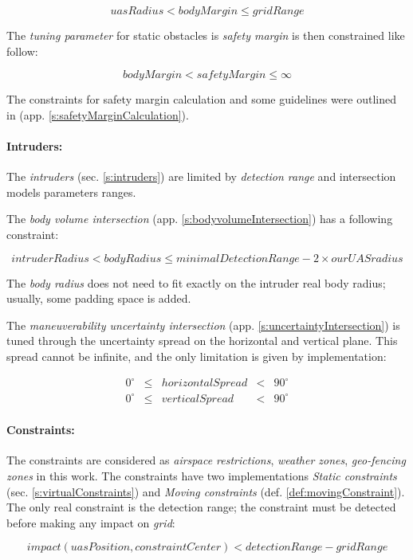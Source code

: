 \begin{equation*}
    uas Radius < body Margin \le grid Range
\end{equation*}

The \emph{tuning parameter} for static obstacles is \emph{safety margin} is then constrained like follow:

\begin{equation*}
    body Margin < safety Margin \le \infty
\end{equation*}


The constraints for safety margin calculation and some guidelines were outlined in (app. \ref{s:safetyMarginCalculation}).

\paragraph{Intruders:} The \emph{intruders} (sec. \ref{s:intruders}) are limited by \emph{detection range} and intersection models parameters ranges. 

The \emph{body volume intersection} (app. \ref{s:bodyvolumeIntersection}) has a following constraint:

\begin{equation*}
    intruder Radius < body Radius \le minimal Detection Range - 2 \times our UAS radius
\end{equation*}

\begin{note}
    The \emph{body radius} does not need to fit exactly on the intruder real body radius; usually, some padding space is added.
\end{note}

The \emph{maneuverability uncertainty intersection} (app. \ref{s:uncertaintyIntersection}) is tuned through the uncertainty spread on the horizontal and vertical plane. This spread cannot be infinite, and the only limitation is given by implementation:

\begin{equation*}
    \begin{aligned}
        0^\circ & \le&  horizontal Spread &< &90^\circ\\
        0^\circ & \le&  vertical Spread &< &90^\circ
    \end{aligned}
\end{equation*}



\paragraph{Constraints:} The constraints are considered as \emph{airspace restrictions}, \emph{weather zones}, \emph{geo-fencing zones} in this work. The constraints have two implementations \emph{Static constraints} (sec. \ref{s:virtualConstraints}) and \emph{Moving constraints} (def. \ref{def:movingConstraint}). The only real constraint is the detection range; the constraint must be detected before making any impact on \emph{grid}:

\begin{equation*}
    impact(uasPosition,constraintCenter) < detection Range - grid Range
\end{equation*}



